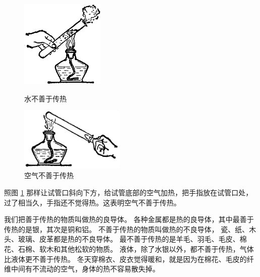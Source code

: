 \begin{figure}[htbp]
    \centering
    \begin{minipage}{7cm}
    \centering
    \includegraphics[width=4cm]{../pic/czwl2-ch2-14}
    \caption{水不善于传热}\label{fig:2-14}
    \end{minipage}
    \qquad
    \begin{minipage}{7cm}
    \centering
    \vspace{1cm}
    \includegraphics[width=5cm]{../pic/czwl2-ch2-15}
    \caption{空气不善于传热}\label{fig:2-15}
    \end{minipage}
\end{figure}


照图 \ref{fig:2-15} 那样让试管口斜向下方，给试管底部的空气加热，把手指放在试管口处，
过了相当久，手指还不觉得热。这表明空气不善于传热。

我们把善于传热的物质叫做热的良导体。
各种金属都是热的良导体，其中最善于传热的是银，其次是铜和铝。
不善于传热的物质叫做热的不良导体，
瓷、纸、木头、玻璃、皮革都是热的不良导体。
最不善于传热的是羊毛、羽毛、毛皮、棉花、石棉、软木和其他松软的物质。
液体，除了水银以外，都不善于传热，气体比液体更不善于传热。
冬天穿棉衣、皮衣觉得暖和，就是因为在棉花、毛皮的纤维中间有不流动的空气，身体的热不容易散失掉。

